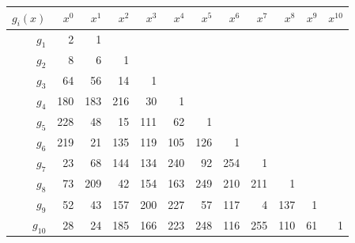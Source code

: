 \begin{center}
\footnotesize
\setlength{\tabcolsep}{4pt}
\renewcommand{\arraystretch}{1.15}
\begin{tabular}{r|rrrrrrrrrrr}
\toprule
$g_i(x)$ & $x^{0}$ & $x^{1}$ & $x^{2}$ & $x^{3}$ & $x^{4}$ & $x^{5}$ & $x^{6}$ & $x^{7}$ & $x^{8}$ & $x^{9}$ & $x^{10}$ \\
\midrule
$g_{1}$ & 2 & 1 &  &  &  &  &  &  &  &  &  \\
$g_{2}$ & 8 & 6 & 1 &  &  &  &  &  &  &  &  \\
$g_{3}$ & 64 & 56 & 14 & 1 &  &  &  &  &  &  &  \\
$g_{4}$ & 180 & 183 & 216 & 30 & 1 &  &  &  &  &  &  \\
$g_{5}$ & 228 & 48 & 15 & 111 & 62 & 1 &  &  &  &  &  \\
$g_{6}$ & 219 & 21 & 135 & 119 & 105 & 126 & 1 &  &  &  &  \\
$g_{7}$ & 23 & 68 & 144 & 134 & 240 & 92 & 254 & 1 &  &  &  \\
$g_{8}$ & 73 & 209 & 42 & 154 & 163 & 249 & 210 & 211 & 1 &  &  \\
$g_{9}$ & 52 & 43 & 157 & 200 & 227 & 57 & 117 & 4 & 137 & 1 &  \\
$g_{10}$ & 28 & 24 & 185 & 166 & 223 & 248 & 116 & 255 & 110 & 61 & 1 \\
\bottomrule
\end{tabular}
\end{center}
